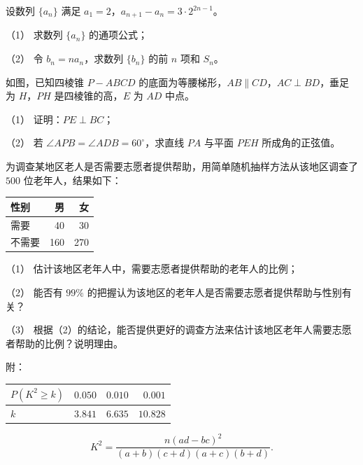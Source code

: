 \begin{question}
设数列 $\{a_n\}$ 满足 $a_1=2$，$a_{n+1}-a_n=3\cdot2^{2n-1}$。

（1） 求数列 $\{a_n\}$ 的通项公式；

（2） 令 $b_n=na_n$，求数列 $\{b_n\}$ 的前 $n$ 项和 $S_n$。

\Needspace{0.4\textheight}
\end{question}
\begin{question}
如图，已知四棱锥 $P-ABCD$ 的底面为等腰梯形，$AB\parallel CD$，$AC\perp BD$，垂足为 $H$，$PH$ 是四棱锥的高，$E$ 为 $AD$ 中点。
\nopagebreak[4]
\begin{center}\end{center}
\nopagebreak[4]
（1） 证明：$PE\perp BC$；

（2） 若 $\angle APB=\angle ADB=60^\circ$，求直线 $PA$ 与平面 $PEH$ 所成角的正弦值。

\end{question}
\begin{question}
为调查某地区老人是否需要志愿者提供帮助，用简单随机抽样方法从该地区调查了 $500$ 位老年人，结果如下：

\begin{center}
\begin{tabular}{lrr}
\toprule
性别 & 男 & 女 \\
\midrule
需要 & 40 & 30 \\
不需要 & 160 & 270 \\
\bottomrule
\end{tabular}
\end{center}

（1） 估计该地区老年人中，需要志愿者提供帮助的老年人的比例；

（2） 能否有 $99\%$ 的把握认为该地区的老年人是否需要志愿者提供帮助与性别有关？

（3） 根据（2）的结论，能否提供更好的调查方法来估计该地区老年人需要志愿者帮助的比例？说明理由。

附：

\begin{center}
\begin{tabular}{lrrr}
\toprule
$P(K^2\geq k)$ & $0.050$ & $0.010$ & $0.001$ \\
\midrule
$k$ & $3.841$ & $6.635$ & $10.828$ \\
\bottomrule
\end{tabular}
\end{center}

\nopagebreak[4]
\[
K^2=\frac{n(ad-bc)^2}{(a+b)(c+d)(a+c)(b+d)}.
\]

\end{question}
